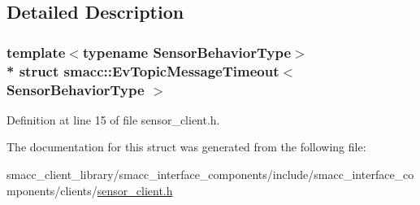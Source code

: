 \subsection{Detailed Description}
\subsubsection*{template$<$typename Sensor\+Behavior\+Type$>$\\*
struct smacc\+::\+Ev\+Topic\+Message\+Timeout$<$ Sensor\+Behavior\+Type $>$}



Definition at line 15 of file sensor\+\_\+client.\+h.



The documentation for this struct was generated from the following file\+:\begin{DoxyCompactItemize}
\item 
smacc\+\_\+client\+\_\+library/smacc\+\_\+interface\+\_\+components/include/smacc\+\_\+interface\+\_\+components/clients/\hyperlink{sensor__client_8h}{sensor\+\_\+client.\+h}\end{DoxyCompactItemize}
